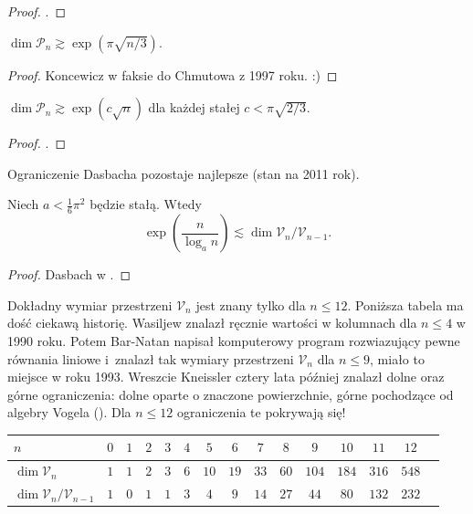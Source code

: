 \begin{proof}
    \cite{duzhin99}.
\end{proof}

\begin{proposition}
    $\dim \mathcal P_n \gtrsim \exp (\pi \sqrt{n/3})$.
\end{proposition}

\begin{proof}
    Koncewicz w faksie do Chmutowa z 1997 roku. :)
\end{proof}

\begin{proposition}
    $\dim \mathcal P_n \gtrsim \exp (c \sqrt{n})$ dla każdej stałej $c < \pi \sqrt{2/3}$.
\end{proposition}

\begin{proof}
    \cite{dasbach00}.
\end{proof}

Ograniczenie Dasbacha pozostaje najlepsze (stan na 2011 rok).

\begin{corollary}
    Niech $a < \frac 1 6 \pi^2$ będzie stałą.
    Wtedy
    \begin{equation}
        \exp \left(\frac {n}{\log_a n} \right) \lesssim \dim \mathcal V_n / \mathcal V_{n-1}.
    \end{equation}
\end{corollary}

\begin{proof}
    Dasbach w \cite{dasbach00}.
\end{proof}

Dokładny wymiar przestrzeni $\mathcal V_n$ jest znany tylko dla $n \le 12$.
Poniższa tabela ma dość ciekawą historię.
Wasiljew znalazł ręcznie wartości w kolumnach dla $n \le 4$ w 1990 roku.
Potem Bar-Natan napisał komputerowy program rozwiazujący pewne równania liniowe i~znalazł tak wymiary przestrzeni $\mathcal V_n$ dla $n \le 9$, miało to miejsce w roku 1993.
Wreszcie Kneissler cztery lata później znalazł dolne oraz górne ograniczenia: dolne oparte o znaczone powierzchnie, górne pochodzące od algebry Vogela (\cite{kneissler97}).
%
Dla $n \le 12$ ograniczenia te pokrywają się!

\renewcommand*{\arraystretch}{1.4}
\footnotesize
\begin{longtable}{lcccccccccccccc}
\hline
    $n$ & $0$ & $1$ & $2$ & $3$ & $4$ & $5$ & $6$ & $7$ & $8$ & $9$ & $10$ & $11$ & $12$ \\ \hline \endhead
    $\dim \mathcal V_n$ & $1$ & $1$ & $2$ & $3$ & $6$ & $10$ & $19$ & $33$ & $60$ & $104$ & $184$ & $316$ & $548$ \\
    $\dim \mathcal V_n / \mathcal V_{n-1}$ & $1$ & $0$ & $1$ & $1$ & $3$ & $4$ & $9$ & $14$ & $27$ & $44$ & $80$ & $132$ & $232$ \\
    \hline
\end{longtable}
\normalsize

